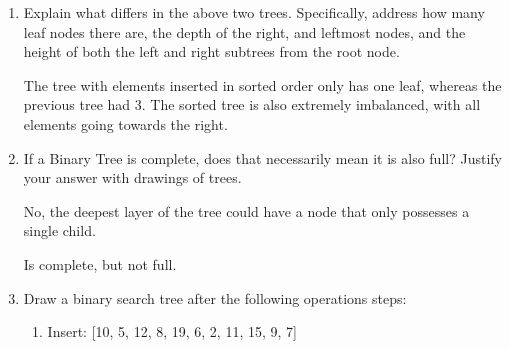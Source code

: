 \documentclass[11pt]{article}
\begin{document}
\begin{enumerate}
        \item Explain what differs in the above two trees. Specifically, address how many leaf nodes there are, the depth of the right, and leftmost nodes, and the height of both the left and right subtrees from the root node.

        The tree with elements inserted in sorted order only has one leaf, whereas the previous tree had 3. The sorted tree is also extremely imbalanced, with all elements going towards the right. 
        
        \item If a Binary Tree is complete, does that necessarily mean it is also full? Justify your answer with drawings of trees.

        No, the deepest layer of the tree could have a node that only possesses a single child.
        

        Is complete, but not full.
        
        \item Draw a binary search tree after the following operations steps:
    \begin{enumerate}
        
        \item Insert: [10, 5, 12, 8, 19, 6, 2, 11, 15, 9, 7]
        
        \begin{center}
        \end{center}
        \vspace{1cm}
        

\end{enumerate}
\end{enumerate}
\end{document}
